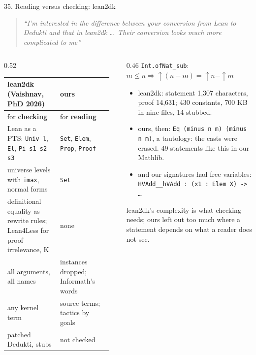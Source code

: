 \documentclass[10pt,aspectratio=169]{beamer}
\newcommand{\bad}[1]{\textcolor{warn}{#1}}
\newcommand{\prompt}[1]{\begin{quote}\small\itshape ``#1''\end{quote}}
\begin{document}
\begin{frame}[fragile]{35. Reading versus checking: lean2dk}
  \scriptsize
  \prompt{I'm interested in the difference between your conversion from Lean to Dedukti and that in
  lean2dk \ldots\ Their conversion looks much more complicated to me}
  \begin{columns}[T]
    \begin{column}{0.52\textwidth}
      \begin{tabular}{@{}>{\raggedright\arraybackslash}p{0.47\linewidth}>{\raggedright\arraybackslash}p{0.47\linewidth}@{}}
        \toprule
        lean2dk (Vaishnav, PhD 2026) & ours \\
        \midrule
        for \textbf{checking} & for \textbf{reading} \\
        Lean as a PTS: \texttt{Univ l}, \texttt{El}, \texttt{Pi s1 s2 s3} & \texttt{Set},
          \texttt{Elem}, \texttt{Prop}, \texttt{Proof} \\
        universe levels with \texttt{imax}, normal forms & \texttt{Set} \\
        definitional equality as rewrite rules; Lean4Less for proof irrelevance, K & none \\
        all arguments, all names & instances dropped; Informath's words \\
        any kernel term & source terms; tactics by goals \\
        patched Dedukti, stubs & not checked \\
        \bottomrule
      \end{tabular}
    \end{column}
    \begin{column}{0.46\textwidth}
      \texttt{Int.ofNat\_sub}: $m \leq n \Rightarrow {\uparrow}(n - m) = {\uparrow}n - {\uparrow}m$
      \begin{itemize}
        \item lean2dk: statement 1,307 characters, proof 14,631; 430 constants, 700 KB in
              nine files, 14 stubbed.
        \item ours, then: \bad{\texttt{Eq (minus n m) (minus n m)}}, a tautology: the
              casts were erased. 49 statements like this in our Mathlib.
        \item and our signatures had \bad{free variables}:
              \texttt{HVAdd\_\_hVAdd : (x1 : Elem X) -> \ldots}
      \end{itemize}
      lean2dk's complexity is what checking needs; ours left out too much where a statement
      depends on what a reader does not see.
    \end{column}
  \end{columns}
\end{frame}
\end{document}
